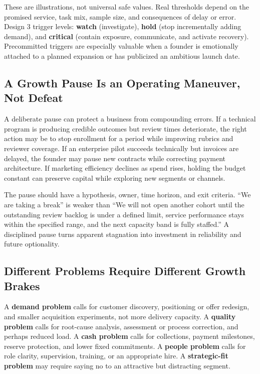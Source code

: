 These are illustrations, not universal safe values. Real thresholds depend on the promised service, task mix, sample size, and consequences of delay or error. Design 3 trigger levels: \textbf{watch} (investigate), \textbf{hold} (stop incrementally adding demand), and \textbf{critical} (contain exposure, communicate, and activate recovery). Precommitted triggers are especially valuable when a founder is emotionally attached to a planned expansion or has publicized an ambitious launch date.

\subsection{A Growth Pause Is an Operating Maneuver, Not Defeat}
\label{sec:growth_pause_maneuver}

A deliberate pause can protect a business from compounding errors. If a technical program is producing credible outcomes but review times deteriorate, the right action may be to stop enrollment for a period while improving rubrics and reviewer coverage. If an enterprise pilot succeeds technically but invoices are delayed, the founder may pause new contracts while correcting payment architecture. If marketing efficiency declines as spend rises, holding the budget constant can preserve capital while exploring new segments or channels.

The pause should have a hypothesis, owner, time horizon, and exit criteria. ``We are taking a break'' is weaker than ``We will not open another cohort until the outstanding review backlog is under a defined limit, service performance stays within the specified range, and the next capacity band is fully staffed.'' A disciplined pause turns apparent stagnation into investment in reliability and future optionality.

\subsection{Different Problems Require Different Growth Brakes}
\label{sec:different_growth_brakes}

A \textbf{demand problem} calls for customer discovery, positioning or offer redesign, and smaller acquisition experiments, not more delivery capacity. A \textbf{quality problem} calls for root-cause analysis, assessment or process correction, and perhaps reduced load. A \textbf{cash problem} calls for collections, payment milestones, reserve protection, and lower fixed commitments. A \textbf{people problem} calls for role clarity, supervision, training, or an appropriate hire. A \textbf{strategic-fit problem} may require saying no to an attractive but distracting segment.

